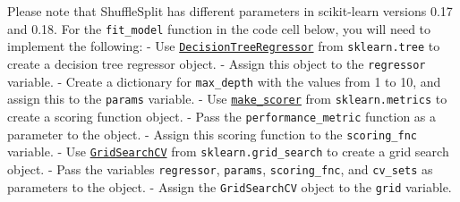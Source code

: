 \documentclass[11pt]{article}
\begin{document}
Please note that ShuffleSplit has different parameters in scikit-learn
versions 0.17 and 0.18. For the \texttt{fit\_model} function in the code
cell below, you will need to implement the following: - Use
\href{http://scikit-learn.org/stable/modules/generated/sklearn.tree.DecisionTreeRegressor.html}{\texttt{DecisionTreeRegressor}}
from \texttt{sklearn.tree} to create a decision tree regressor object. -
Assign this object to the
\texttt{\textquotesingle{}regressor\textquotesingle{}} variable. -
Create a dictionary for
\texttt{\textquotesingle{}max\_depth\textquotesingle{}} with the values
from 1 to 10, and assign this to the
\texttt{\textquotesingle{}params\textquotesingle{}} variable. - Use
\href{http://scikit-learn.org/stable/modules/generated/sklearn.metrics.make_scorer.html}{\texttt{make\_scorer}}
from \texttt{sklearn.metrics} to create a scoring function object. -
Pass the \texttt{performance\_metric} function as a parameter to the
object. - Assign this scoring function to the
\texttt{\textquotesingle{}scoring\_fnc\textquotesingle{}} variable. -
Use
\href{http://scikit-learn.org/0.17/modules/generated/sklearn.grid_search.GridSearchCV.html}{\texttt{GridSearchCV}}
from \texttt{sklearn.grid\_search} to create a grid search object. -
Pass the variables
\texttt{\textquotesingle{}regressor\textquotesingle{}},
\texttt{\textquotesingle{}params\textquotesingle{}},
\texttt{\textquotesingle{}scoring\_fnc\textquotesingle{}}, and
\texttt{\textquotesingle{}cv\_sets\textquotesingle{}} as parameters to
the object. - Assign the \texttt{GridSearchCV} object to the
\texttt{\textquotesingle{}grid\textquotesingle{}} variable.
\end{document}
